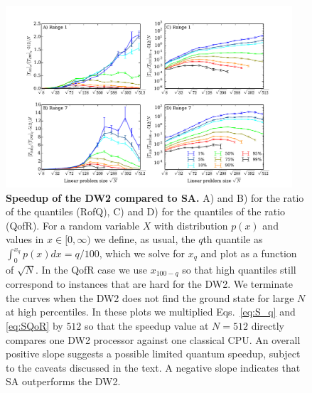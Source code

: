 \begin{figure}
\includegraphics[width=0.95\textwidth]{chapters/Speedup/fig07.pdf}
\caption{{\bf Speedup of the DW2 compared to SA.} A) and B) for the ratio of the quantiles (RofQ), C) and D) for the quantiles of the ratio (QofR). For a random variable $X$ with distribution $p(x)$ and values in $x\in [0,\infty)$ we define, as usual, the $q$th quantile as $\int_0^{x_q} p(x) dx = q/100$, which we solve for $x_q$ and plot as a function of $\sqrt{N}$. In the QofR case we use $x_{100-q}$  so that high quantiles still correspond to instances that are hard for the DW2. We terminate the curves when the DW2 does not find the ground state for large $N$ at high percentiles. In these plots we multiplied Eqs.~\eqref{eq:S_q} and \eqref{eq:SQoR} by $512$ so that the speedup value at $N=512$ directly compares one DW2 processor against one classical CPU. An overall positive slope suggests a possible limited quantum speedup, subject to the caveats discussed in the text. A negative slope indicates that SA outperforms the DW2.
}
\label{fig:qorspeedup7}
\end{figure}

